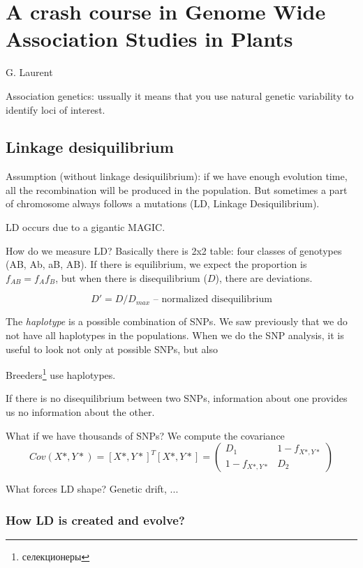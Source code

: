 \documentclass[main.tex]{subfiles}
\begin{document}

\section{A crash course in Genome Wide Association Studies in Plants}

G. Laurent

Association genetics: ussually it means that you use natural genetic variability to identify loci of interest.

\subsection{ Linkage desiquilibrium }

Assumption (without linkage desiquilibrium): if we have enough evolution time, all the recombination will be produced in the population.
But sometimes a part of chromosome always follows a mutations (LD, Linkage Desiquilibrium).

LD occurs due to a gigantic MAGIC.

How do we measure LD?
Basically there is 2x2 table: four classes of genotypes (AB, Ab, aB, AB).
If there is equilibrium, we expect the proportion is $ f_{AB} = f_A f_B $, but when there is disequilibrium ($D$), there are deviations.

\[ D' = D / D_{max} \text{ -- normalized disequilibrium} \]

The \emph{haplotype} is a possible combination of SNPs.
We saw previously that we do not have all haplotypes in the populations.
When we do the SNP analysis, it is useful to look not only at possible SNPs, but also

Breeders\footnote{селекционеры} use haplotypes.

If there is no disequilibrium between two SNPs, information about one provides us no information about the other.

What if we have thousands of SNPs?
We compute the covariance 
\[ Cov(X*, Y*) = [X*, Y*]^T [X*, Y*] = \begin{pmatrix}
	D_1 & 1 - f_{X*,Y*} \\
	1 - f_{X*, Y*} & D_2
\end{pmatrix} \] %

What forces LD shape? Genetic drift, ... %

\subsubsection{How LD is created and evolve?}
\end{document}
